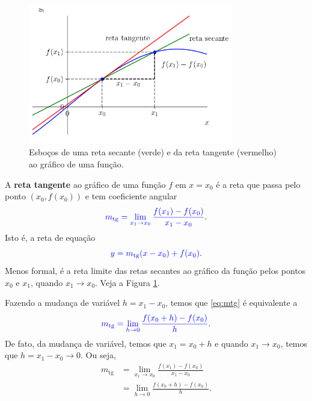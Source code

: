 \begin{figure}[H]
  \centering
  \includegraphics[width=0.8\textwidth]{./cap_deriv/dados/fig_retsectg/fig}
  \caption{Esboços de uma reta secante (verde) e da reta tangente (vermelho) ao gráfico de uma função.}
  \label{fig:retsectg}
\end{figure}

A {\bf reta tangente} ao gráfico de uma função $f$ em $x=x_0$ é a reta que passa pelo ponto $(x_0, f(x_0))$ e tem coeficiente angular
\begin{equation}\label{eq:mtg}
  {\color{blue}m_{\text{tg}} = \lim_{x_1\to x_0} \frac{f(x_1)-f(x_0)}{x_1-x_0}}.
\end{equation}
Isto é, a reta de equação
\begin{equation}
  {\color{blue}y = m_{\text{tg}}(x-x_0)+f(x_0)}.
\end{equation}
Menos formal, é a reta limite das retas secantes ao gráfico da função pelos pontos $x_0$ e $x_1$, quando $x_1\to x_0$. Veja a Figura \ref{fig:retsectg}.

\begin{obs}
  Fazendo a mudança de variável $h = x_1-x_0$, temos que \eqref{eq:mtg} é equivalente a
  \begin{equation}
    {\color{blue}m_{\text{tg}} = \lim_{h\to 0} \frac{f(x_0+h)-f(x_0)}{h}}.
  \end{equation}
  De fato, da mudança de variável, temos que $x_1 = x_0+h$ e quando $x_1\to x_0$, temos que $h = x_1-x_0\to 0$. Ou seja,
  \begin{align}
    m_{\text{tg}} &= \lim_{x_1\to x_0} \frac{f(x_1)-f(x_0)}{x_1-x_0}\\
                  &= \lim_{h\to 0} \frac{f(x_0+h)-f(x_0)}{h}.
  \end{align}
\end{obs}

